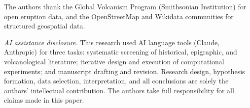 \documentclass[egqsj, manuscript]{copernicus}
\begin{document}

\begin{acknowledgements}
The authors thank the Global Volcanism Program (Smithsonian Institution) for open eruption data, and the OpenStreetMap and Wikidata communities for structured geospatial data.

\textit{AI assistance disclosure.} This research used AI language tools (Claude, Anthropic) for three tasks: systematic screening of historical, epigraphic, and volcanological literature; iterative design and execution of computational experiments; and manuscript drafting and revision. Research design, hypothesis formation, data selection, interpretation, and all conclusions are solely the authors' intellectual contribution. The authors take full responsibility for all claims made in this paper.
\end{acknowledgements}




\end{document}
